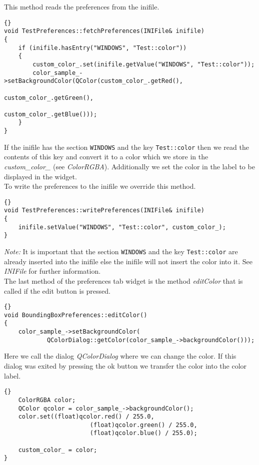 This method reads the preferences from the inifile.

\begin{lstlisting}{}
void TestPreferences::fetchPreferences(INIFile& inifile)
{
	if (inifile.hasEntry("WINDOWS", "Test::color"))
	{
		custom_color_.set(inifile.getValue("WINDOWS", "Test::color"));
		color_sample_->setBackgroundColor(QColor(custom_color_.getRed(), 
																						 custom_color_.getGreen(), 
																						 custom_color_.getBlue()));
	}
}
\end{lstlisting}

If the inifile has the section {\tt WINDOWS} and the key {\tt Test::color} then
we read the contents of this key and convert it to a color which we store in the
{\em custom\_color\_} (see {\em ColorRGBA}). Additionally we set the color in the label to be displayed
in the widget.\\

To write the preferences to the inifile we override this method.

\begin{lstlisting}{}
void TestPreferences::writePreferences(INIFile& inifile)
{
	inifile.setValue("WINDOWS", "Test::color", custom_color_);
}
\end{lstlisting}

{\em Note:} It is important that the section {\tt WINDOWS} and the key {\tt Test::color} are
already inserted into the inifile else the inifile will not insert the color
into it. See {\em INIFile} for further information.\\

The last method of the preferences tab widget is the method {\em editColor} that
is called if the edit button is pressed.

\begin{lstlisting}{}
void BoundingBoxPreferences::editColor()
{
	color_sample_->setBackgroundColor(
			QColorDialog::getColor(color_sample_->backgroundColor()));
\end{lstlisting}

Here we call the dialog {\em QColorDialog} where we can change the color. If this
dialog was exited by pressing the ok button we transfer the color into the color label.

\begin{lstlisting}{}
	ColorRGBA color;
	QColor qcolor = color_sample_->backgroundColor();
	color.set((float)qcolor.red() / 255.0,
						(float)qcolor.green() / 255.0,
						(float)qcolor.blue() / 255.0);
	
	custom_color_ = color;
}
\end{lstlisting}

